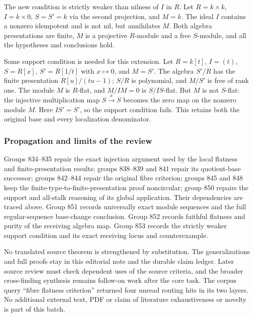 The new condition is strictly weaker than nilness of \(I\) in \(R\). Let \(R=k\times k\), \(I=k\times0\), \(S=S'=k\) via the second projection, and \(M=k\). The ideal \(I\) contains a nonzero idempotent and is not nil, but annihilates \(M\). Both algebra presentations are finite, \(M\) is a projective \(R\)-module and a free \(S\)-module, and all the hypotheses and conclusions hold.

Some support condition is needed for this extension. Let \(R=k[t]\), \(I=(t)\), \(S=R[x]\), \(S'=R[1/t]\) with \(x\mapsto0\), and \(M=S'\). The algebra \(S'/R\) has the finite presentation \(R[u]/(tu-1)\); \(S/R\) is polynomial, and \(M/S'\) is free of rank one. The module \(M\) is \(R\)-flat, and \(M/IM=0\) is \(S/IS\)-flat. But \(M\) is not \(S\)-flat: the injective multiplication map \(S\xrightarrow{x}S\) becomes the zero map on the nonzero module \(M\). Here \(IS'=S'\), so the support condition fails. This retains both the original base and every localization denominator.

\subsubsection{Propagation and limits of the review}\label{algebra-proof-038-propagation-and-limits-of-the-review}

Groups 834--835 repair the exact injection argument used by the local flatness and finite-presentation results; groups 838--839 and 841 repair its quotient-base successor; groups 842--844 repair the original fibre criterion; groups 845 and 848 keep the finite-type-to-finite-presentation proof noncircular; group 850 repairs the support and all-stalk reasoning of its global application. Their dependencies are traced above. Group 851 records universally exact module sequences and the full regular-sequence base-change conclusion. Group 852 records faithful flatness and purity of the receiving algebra map. Group 853 records the strictly weaker support condition and its exact receiving locus and counterexample.

No translated source theorem is strengthened by substitution. The generalizations and full proofs stay in this editorial note and the durable claim ledger. Later source review must check dependent uses of the source criteria, and the broader cross-finding synthesis remains follow-on work after the core task. The corpus query ``fibre flatness criterion'' returned four unread routing hits in its two layers. No additional external text, PDF or claim of literature exhaustiveness or novelty is part of this batch.
